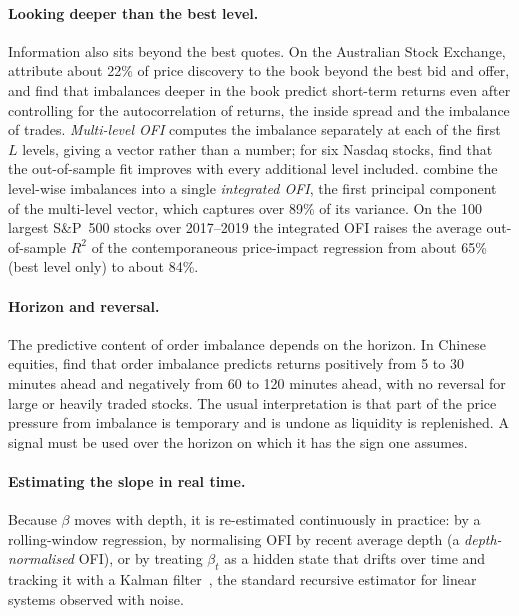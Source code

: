 \paragraph{Looking deeper than the best level.} Information also sits beyond the best quotes. On
the Australian Stock Exchange, \citet{cao2009} attribute about 22\% of price discovery to the book
beyond the best bid and offer, and find that imbalances deeper in the book predict short-term
returns even after controlling for the autocorrelation of returns, the inside spread and the imbalance
of trades. \emph{Multi-level OFI} computes the
imbalance separately at each of the first $L$ levels, giving a vector rather than a number; for six
Nasdaq stocks, \citet{xu2019mlofi} find that the out-of-sample fit improves with every additional
level included. \citet{contcucuringu2023} combine the level-wise imbalances into a single
\emph{integrated OFI}, the first principal component of the multi-level vector, which captures over
89\% of its variance. On the 100 largest S\&P~500 stocks over 2017--2019 the integrated OFI raises
the average out-of-sample $R^2$ of the contemporaneous price-impact regression from about 65\%
(best level only) to about 84\%.

\paragraph{Horizon and reversal.} The predictive content of order imbalance depends on the horizon.
In Chinese equities, \citet{zhang2025oi} find that order imbalance predicts returns positively from
5 to 30 minutes ahead and negatively from 60 to 120 minutes ahead, with no reversal for large or
heavily traded stocks. The usual interpretation is that part of the price pressure from imbalance
is temporary and is undone as liquidity is replenished. A signal must be used over the horizon on
which it has the sign one assumes.

\paragraph{Estimating the slope in real time.} Because $\beta$ moves with depth, it is re-estimated
continuously in practice: by a rolling-window regression, by normalising OFI by recent average
depth (a \emph{depth-normalised} OFI), or by treating $\beta_t$ as a hidden state that drifts over
time and tracking it with a Kalman filter~\citep{kalman1960}, the standard recursive estimator for
linear systems observed with noise.

